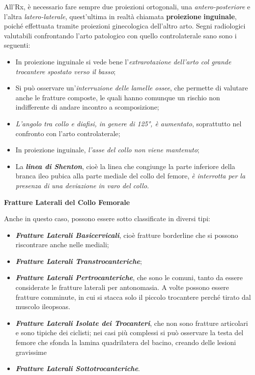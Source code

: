 \documentclass[]{article}
\begin{document}
All'Rx, è necessario fare sempre due proiezioni ortogonali, una
\emph{antero-posteriore} e l'altra \emph{latero-laterale}, quest'ultima
in realtà chiamata \textbf{proiezione} \textbf{inguinale}, poiché
effettuata tramite proiezioni ginecologica dell'altro arto. Segni
radiologici valutabili confrontando l'arto patologico con quello
controlaterale sano sono i seguenti:

\begin{itemize}
\item
  In proiezione inguinale si vede bene l'\emph{extrarotazione dell'arto
  col grande trocantere spostato verso il basso};
\item
  Si può osservare un'\emph{interruzione delle lamelle ossee}, che
  permette di valutare anche le fratture composte, le quali hanno
  comunque un rischio non indifferente di andare incontro a
  scomposizione;
\item
  \emph{L'angolo tra collo e diafisi, in genere di 125°, è aumentato},
  soprattutto nel confronto con l'arto controlaterale;
\item
  In proiezione inguinale, \emph{l'asse del collo non viene mantenuto};
\item
  La \textbf{\emph{linea di Shenton}}, cioè la linea che congiunge la
  parte inferiore della branca ileo pubica alla parte mediale del collo
  del femore, \emph{è interrotta per la presenza di una deviazione in
  varo del collo}.
\end{itemize}

\textbf{Fratture Laterali del Collo Femorale}

Anche in questo caso, possono essere sotto classificate in diversi tipi:

\begin{itemize}
\item
  \textbf{\emph{Fratture Laterali Basicervicali}}, cioè fratture
  borderline che si possono riscontrare anche nelle mediali;
\item
  \textbf{\emph{Fratture Laterali Transtrocanteriche}};
\item
  \textbf{\emph{Fratture Laterali Pertrocanteriche}}, che sono le
  comuni, tanto da essere considerate le fratture laterali per
  antonomasia. A volte possono essere fratture comminute, in cui si
  stacca solo il piccolo trocantere perché tirato dal muscolo ileopsoas.
\item
  \textbf{\emph{Fratture Laterali Isolate dei Trocanteri}}, che non sono
  fratture articolari e sono tipiche dei ciclisti; nei casi più
  complessi si può osservare la testa del femore che sfonda la lamina
  quadrilatera del bacino, creando delle lesioni gravissime
\item
  \textbf{\emph{Fratture Laterali Sottotrocanteriche}}.
\end{itemize}
\end{document}
